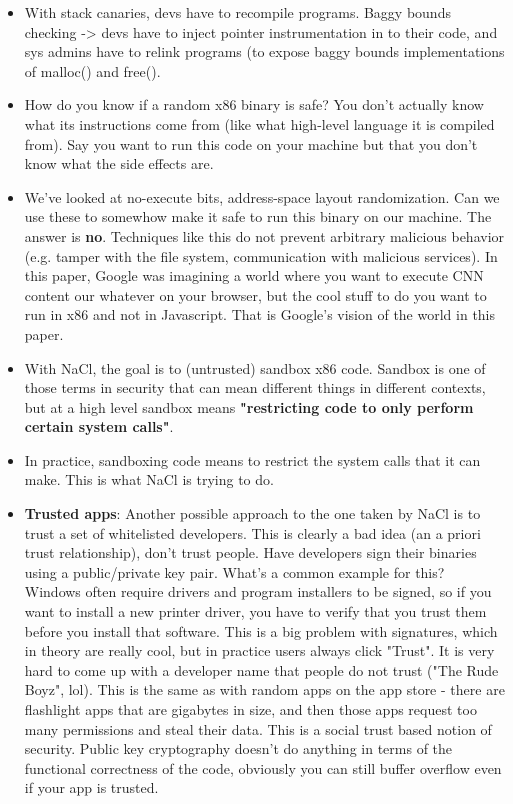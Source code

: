 \documentclass[12pt]{article}
\theoremstyle{definition}
\begin{document}
\begin{itemize}
    \itemsep0em 
	\item With stack canaries, devs have to recompile programs. Baggy bounds checking -> devs have to inject pointer instrumentation in to their code, and sys admins have to relink programs (to expose baggy bounds implementations of malloc() and free().
    \item How do you know if a random x86 binary is safe? You don't actually know what its instructions come from (like what high-level language it is compiled from). Say you want to run this code on your machine but that you don't know what the side effects are.
    \item We've looked at no-execute bits, address-space layout randomization. Can we use these to somewhow make it safe to run this binary on our machine. The answer is \textbf{no}. Techniques like this do not prevent arbitrary malicious behavior (e.g. tamper with the file system, communication with malicious services). In this paper, Google was imagining a world where you want to execute CNN content our whatever on your browser, but the cool stuff to do you want to run in x86 and not in Javascript. That is Google's vision of the world in this paper.
    \item With NaCl, the goal is to (untrusted) sandbox x86 code. Sandbox is one of those terms in security that can mean different things in different contexts, but at a high level sandbox means \textbf{"restricting code to only perform certain system calls"}.
    \item In practice, sandboxing code means to restrict the system calls that it can make. This is what NaCl is trying to do.
    \item \textbf{Trusted apps}: Another possible approach to the one taken by NaCl is to trust a set of whitelisted developers. This is clearly a bad idea (an a priori trust relationship), don't trust people. Have developers sign their binaries using a public/private key pair. What's a common example for this? Windows often require drivers and program installers to be signed, so if you want to install a new printer driver, you have to verify that you trust them before you install that software. This is a big problem with signatures, which in theory are really cool, but in practice users always click "Trust". It is very hard to come up with a developer name that people do not trust ("The Rude Boyz", lol). This is the same as with random apps on the app store - there are flashlight apps that are gigabytes in size, and then those apps request too many permissions and steal their data. This is a social trust based notion of security. Public key cryptography doesn't do anything in terms of the functional correctness of the code, obviously you can still buffer overflow even if your app is trusted.

\end{itemize}
\end{document}
